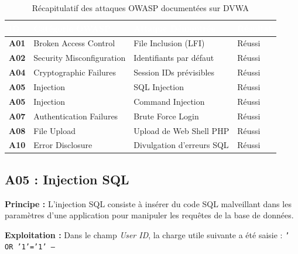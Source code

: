 \documentclass[12pt,a4paper,openany]{report}
\begin{document}
\begin{table}[H]
    \centering
    \renewcommand{\arraystretch}{1.8}
    \setlength{\tabcolsep}{10pt}
    \setlength{\arrayrulewidth}{0.8pt}
    \begin{tabularx}{\textwidth}{|>{\bfseries\centering\arraybackslash}p{1.4cm}|p{4cm}|X|>{\centering\arraybackslash}p{2cm}|}
        \arrayrulecolor{tableborder}
        \hline
        \rowcolor{tableheadbg}
        \textcolor{white}{\textbf{ID}} &
        \textcolor{white}{\textbf{Catégorie OWASP}} &
        \textcolor{white}{\textbf{Attaque Démontrée}} &
        \textcolor{white}{\textbf{Résultat}} \\
        \hline
        \rowcolor{tablerowalt}
        A01 & Broken Access Control & File Inclusion (LFI) & Réussi \\
        \hline
        A02 & Security Misconfiguration & Identifiants par défaut & Réussi \\
        \hline
        \rowcolor{tablerowalt}
        A04 & Cryptographic Failures & Session IDs prévisibles & Réussi \\
        \hline
        A05 & Injection & SQL Injection & Réussi \\
        \hline
        \rowcolor{tablerowalt}
        A05 & Injection & Command Injection & Réussi \\
        \hline
        A07 & Authentication Failures & Brute Force Login & Réussi \\
        \hline
        \rowcolor{tablerowalt}
        A08 & File Upload & Upload de Web Shell PHP & Réussi \\
        \hline
        A10 & Error Disclosure & Divulgation d'erreurs SQL & Réussi \\
        \hline
    \end{tabularx}
    \caption{Récapitulatif des attaques OWASP documentées sur DVWA}
    \label{tab:dvwa-attacks}
\end{table}

\subsection{A05 : Injection SQL}

\textbf{Principe :} L'injection SQL consiste à insérer du code SQL malveillant dans les paramètres
d'une application pour manipuler les requêtes de la base de données.

\textbf{Exploitation :} Dans le champ \textit{User ID}, la charge utile suivante a été saisie :
\texttt{' OR '1'='1' --}
\end{document}
